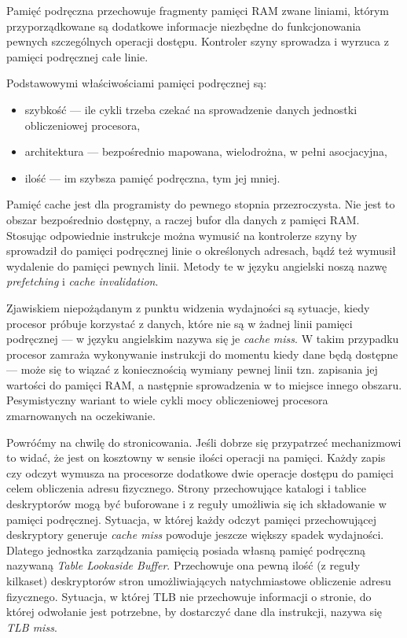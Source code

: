 \documentclass[12pt,a4paper,titlepage,twoside]{mwart}
\begin{document}
Pamięć podręczna przechowuje fragmenty pamięci RAM zwane liniami, którym
przyporządkowane są dodatkowe informacje niezbędne do funkcjonowania pewnych
szczególnych operacji dostępu. Kontroler szyny sprowadza i wyrzuca z pamięci
podręcznej całe linie.

Podstawowymi właściwościami pamięci podręcznej są:
\begin{itemize}
\item szybkość --- ile cykli trzeba czekać na sprowadzenie danych jednostki
obliczeniowej procesora,
\item architektura --- bezpośrednio mapowana, wielodrożna, w pełni asocjacyjna,
\item ilość --- im szybsza pamięć podręczna, tym jej mniej. 
\end{itemize}

Pamięć cache jest dla programisty do pewnego stopnia przezroczysta. Nie jest to
obszar bezpośrednio dostępny, a raczej bufor dla danych z pamięci RAM. Stosując
odpowiednie instrukcje można wymusić na kontrolerze szyny by sprowadził do
pamięci podręcznej linie o określonych adresach, bądź też wymusił wydalenie do
pamięci pewnych linii. Metody te w języku angielski noszą nazwę
\textit{prefetching} i \textit{cache invalidation}.

Zjawiskiem niepożądanym z punktu widzenia wydajności są sytuacje, kiedy
procesor próbuje korzystać z danych, które nie są w żadnej linii pamięci
podręcznej --- w języku angielskim nazywa się je \textit{cache miss}. W takim
przypadku procesor zamraża wykonywanie instrukcji do momentu kiedy dane będą
dostępne --- może się to wiązać z koniecznością wymiany pewnej linii tzn.
zapisania jej wartości do pamięci RAM, a następnie sprowadzenia w to miejsce
innego obszaru. Pesymistyczny wariant to wiele cykli mocy obliczeniowej
procesora zmarnowanych na oczekiwanie.

Powróćmy na chwilę do stronicowania. Jeśli dobrze się przypatrzeć mechanizmowi
to widać, że jest on kosztowny w sensie ilości operacji na pamięci. Każdy zapis
czy odczyt wymusza na procesorze dodatkowe dwie operacje dostępu do pamięci
celem obliczenia adresu fizycznego. Strony przechowujące katalogi i tablice
deskryptorów mogą być buforowane i z reguły umożliwia się ich składowanie w
pamięci podręcznej. Sytuacja, w której każdy odczyt pamięci przechowującej
deskryptory generuje \textit{cache miss} powoduje jeszcze większy spadek
wydajności. Dlatego jednostka zarządzania pamięcią posiada własną pamięć
podręczną nazywaną \textit{Table Lookaside Buffer}. Przechowuje ona pewną ilość
(z reguły kilkaset) deskryptorów stron umożliwiających natychmiastowe
obliczenie adresu fizycznego. Sytuacja, w której TLB nie przechowuje informacji
o stronie, do której odwołanie jest potrzebne, by dostarczyć dane dla
instrukcji, nazywa się \textit{TLB miss}.
\end{document}
